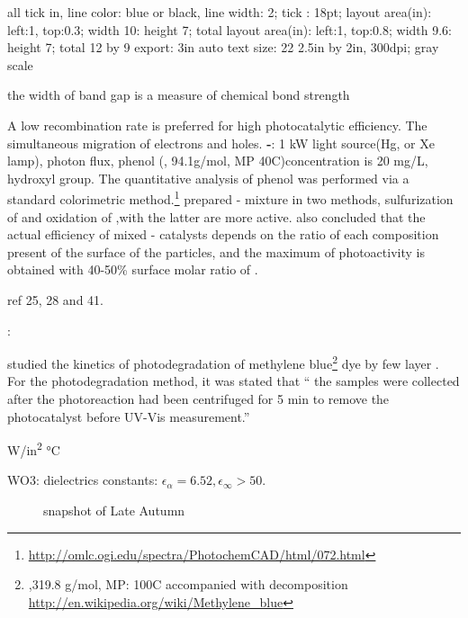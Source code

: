  all tick in, line color: blue or black, line width: 2; tick : 18pt;
 layout area(in): left:1, top:0.3; width 10: height 7; total 
 layout area(in): left:1, top:0.8; width 9.6: height 7; total 12 by 9
 export: 3in auto
 text size: 22
2.5in by 2in, 300dpi; gray scale

the width of band gap is a measure of chemical bond strength

A low recombination rate is preferred for high photocatalytic efficiency. The simultaneous migration of electrons and holes.
\textbf{-}: 1 kW light source(Hg, or Xe lamp), photon flux, phenol (, 94.1g/mol, MP 40C)concentration is 20 mg/L, hydroxyl group. The quantitative analysis of phenol was performed via a standard colorimetric method.\footnote{\url{http://omlc.ogi.edu/spectra/PhotochemCAD/html/072.html}}
\citeauthor{DiPaola1999} prepared - mixture in two methods, sulfurization of  and oxidation of ,with the latter are more active.
\citeauthor{DiPaola1999} also concluded that the actual efficiency of mixed - catalysts depends on the ratio of each composition present of the surface of the particles, and the maximum of photoactivity is obtained with 40-50\% surface molar ratio of .

ref 25, 28 and 41.

\textbf{}:

\citeauthor{Sreedhara2013} studied the kinetics of photodegradation of methylene blue\footnote{,319.8 g/mol, MP: 100C accompanied with decomposition \url{http://en.wikipedia.org/wiki/Methylene_blue}} dye by few layer .
For the photodegradation method, it was stated that `` the samples were collected after the photoreaction had been centrifuged for 5 min to remove the photocatalyst before UV-Vis measurement.''


\si{W/in^2}
\si{\degreeCelsius}

 WO3: dielectrics constants: $\epsilon_\alpha = 6.52,\epsilon_\infty > 50$. \cite{Deb2008}
\begin{figure}[htb]
\centering
{}\hspace{0.04\textwidth}

\caption{snapshot of Late Autumn}
\label{fig:tw}
\end{figure}

